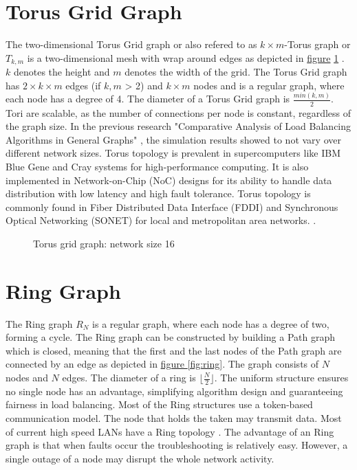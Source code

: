 \section{Torus Grid Graph}\label{sec:2torusgridgraph}
The two-dimensional Torus Grid graph or also refered to as $k \times m$-Torus graph or $T_{k,m}$ is a two-dimensional mesh with wrap around edges as depicted in \hyperref[fig:torusGraph]{figure} \ref{fig:torusGraph} \cite{Mahlmann2010}. $k$ denotes the height and $m$ denotes the width of the grid. The Torus Grid graph has $2\times k \times m$  edges (if $k, m$ > 2) and $k \times m$ nodes and is a regular graph, where each node has a degree of 4. The diameter of a Torus Grid graph is $\frac{min(k,m)}{2}$. Tori are scalable, as the number of connections per node is constant, regardless of the graph size. In the previous research "Comparative Analysis of Load Balancing Algorithms in General Graphs" \cite{Bayazitoglu}, the simulation results showed to not vary over different network sizes. Torus topology is prevalent in supercomputers like IBM Blue Gene and Cray systems for high-performance computing. It is also implemented in Network-on-Chip (NoC) designs for its ability to handle data distribution with low latency and high fault tolerance. Torus topology is commonly found in Fiber Distributed Data Interface (FDDI) and Synchronous Optical Networking (SONET) for local and metropolitan area networks. \cite{Banerjee2001}.

\begin{figure}[H]
    \centering
    \scalebox{1.5}{}
    \caption{Torus grid graph: network size 16}
    \label{fig:torusGraph}
\end{figure}

\section{Ring Graph}\label{sec:2ringgraph}
The Ring graph $R_N$ is a regular graph, where each node has a degree of two, forming a cycle. The Ring graph can be constructed by building a Path graph which is closed, meaning that the first and the last nodes of the Path graph are connected by an edge as depicted in \hyperref[fig:ring]{figure } \ref{fig:ring}. The graph consists of $N$ nodes and $N$ edges. The diameter of a ring is $\lfloor{\frac{N}{2}}\rfloor$. The uniform structure ensures no single node has an advantage, simplifying algorithm design and guaranteeing fairness in load balancing.  Most of the Ring structures use a token-based communication model. The node that holds the taken may transmit data. Most of current high speed LANs have a Ring topology \cite{Vidomenko1997}. The advantage of an Ring graph is that when faults occur the troubleshooting is relatively easy. However, a single outage of a node may disrupt the whole network activity.

